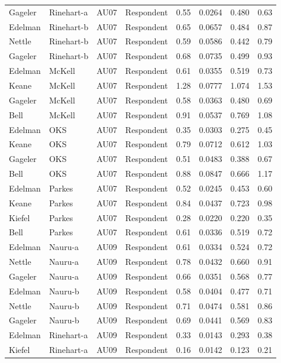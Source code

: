 \documentclass{monashthesis}
\begin{document}
\begin{center}
\begin{longtable}{llllllll}
Gageler & Rinehart-a & AU07 & Respondent & 0.55 & 0.0264 & 0.480 & 0.63 \\
Edelman & Rinehart-b & AU07 & Respondent & 0.65 & 0.0657 & 0.484 & 0.87 \\
Nettle & Rinehart-b & AU07 & Respondent & 0.59 & 0.0586 & 0.442 & 0.79 \\
Gageler & Rinehart-b & AU07 & Respondent & 0.68 & 0.0735 & 0.499 & 0.93 \\
Edelman & McKell & AU07 & Respondent & 0.61 & 0.0355 & 0.519 & 0.73 \\
Keane & McKell & AU07 & Respondent & 1.28 & 0.0777 & 1.074 & 1.53 \\
Gageler & McKell & AU07 & Respondent & 0.58 & 0.0363 & 0.480 & 0.69 \\
Bell & McKell & AU07 & Respondent & 0.91 & 0.0537 & 0.769 & 1.08 \\
Edelman & OKS & AU07 & Respondent & 0.35 & 0.0303 & 0.275 & 0.45 \\
Keane & OKS & AU07 & Respondent & 0.79 & 0.0712 & 0.612 & 1.03 \\
Gageler & OKS & AU07 & Respondent & 0.51 & 0.0483 & 0.388 & 0.67 \\
Bell & OKS & AU07 & Respondent & 0.88 & 0.0847 & 0.666 & 1.17 \\
Edelman & Parkes & AU07 & Respondent & 0.52 & 0.0245 & 0.453 & 0.60 \\
Keane & Parkes & AU07 & Respondent & 0.84 & 0.0437 & 0.723 & 0.98 \\
Kiefel & Parkes & AU07 & Respondent & 0.28 & 0.0220 & 0.220 & 0.35 \\
Bell & Parkes & AU07 & Respondent & 0.61 & 0.0336 & 0.519 & 0.72 \\
Edelman & Nauru-a & AU09 & Respondent & 0.61 & 0.0334 & 0.524 & 0.72 \\
Nettle & Nauru-a & AU09 & Respondent & 0.78 & 0.0432 & 0.660 & 0.91 \\
Gageler & Nauru-a & AU09 & Respondent & 0.66 & 0.0351 & 0.568 & 0.77 \\
Edelman & Nauru-b & AU09 & Respondent & 0.58 & 0.0404 & 0.477 & 0.71 \\
Nettle & Nauru-b & AU09 & Respondent & 0.71 & 0.0474 & 0.581 & 0.86 \\
Gageler & Nauru-b & AU09 & Respondent & 0.69 & 0.0441 & 0.569 & 0.83 \\
Edelman & Rinehart-a & AU09 & Respondent & 0.33 & 0.0143 & 0.293 & 0.38 \\
Kiefel & Rinehart-a & AU09 & Respondent & 0.16 & 0.0142 & 0.123 & 0.21 \\

\end{longtable}
\end{center}
\end{document}

